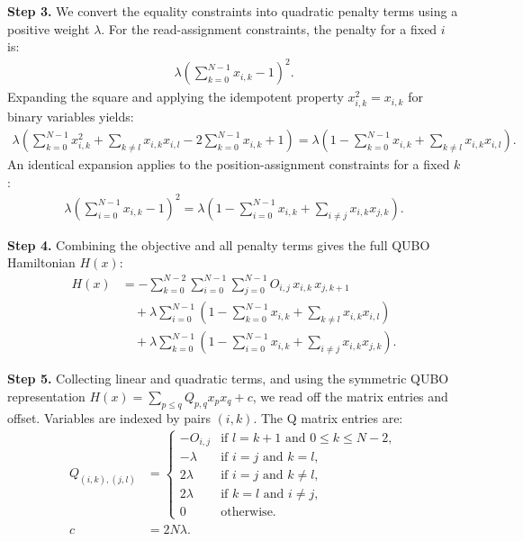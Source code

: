 \documentclass[12pt]{article}
\begin{document}
\textbf{Step 3.} We convert the equality constraints into quadratic penalty terms using a positive weight $\lambda$. For the read-assignment constraints, the penalty for a fixed $i$ is:
\begin{align}
\lambda \left( \sum_{k=0}^{N-1} x_{i,k} - 1 \right)^2.
\end{align}
Expanding the square and applying the idempotent property $x_{i,k}^2 = x_{i,k}$ for binary variables yields:
\begin{align}
\lambda \left( \sum_{k=0}^{N-1} x_{i,k}^2 + \sum_{k \neq l} x_{i,k} x_{i,l} - 2\sum_{k=0}^{N-1} x_{i,k} + 1 \right) = \lambda \left( 1 - \sum_{k=0}^{N-1} x_{i,k} + \sum_{k \neq l} x_{i,k} x_{i,l} \right).
\end{align}
An identical expansion applies to the position-assignment constraints for a fixed $k$:
\begin{align}
\lambda \left( \sum_{i=0}^{N-1} x_{i,k} - 1 \right)^2 = \lambda \left( 1 - \sum_{i=0}^{N-1} x_{i,k} + \sum_{i \neq j} x_{i,k} x_{j,k} \right).
\end{align}

\textbf{Step 4.} Combining the objective and all penalty terms gives the full QUBO Hamiltonian $H(x)$:
\begin{align}
H(x) &= -\sum_{k=0}^{N-2} \sum_{i=0}^{N-1} \sum_{j=0}^{N-1} O_{i,j} \, x_{i,k} \, x_{j,k+1} \nonumber \\
&\quad + \lambda \sum_{i=0}^{N-1} \left( 1 - \sum_{k=0}^{N-1} x_{i,k} + \sum_{k \neq l} x_{i,k} x_{i,l} \right) \nonumber \\
&\quad + \lambda \sum_{k=0}^{N-1} \left( 1 - \sum_{i=0}^{N-1} x_{i,k} + \sum_{i \neq j} x_{i,k} x_{j,k} \right).
\end{align}

\textbf{Step 5.} Collecting linear and quadratic terms, and using the symmetric QUBO representation $H(x) = \sum_{p \le q} Q_{p,q} x_p x_q + c$, we read off the matrix entries and offset. Variables are indexed by pairs $(i,k)$. The Q matrix entries are:
\begin{align}
Q_{(i,k),(j,l)} &= 
\begin{cases} 
-O_{i,j} & \text{if } l = k+1 \text{ and } 0 \le k \le N-2, \\
-\lambda & \text{if } i=j \text{ and } k=l, \\
2\lambda & \text{if } i=j \text{ and } k \neq l, \\
2\lambda & \text{if } k=l \text{ and } i \neq j, \\
0 & \text{otherwise}.
\end{cases} \\
c &= 2N\lambda.
\end{align}
\end{document}
